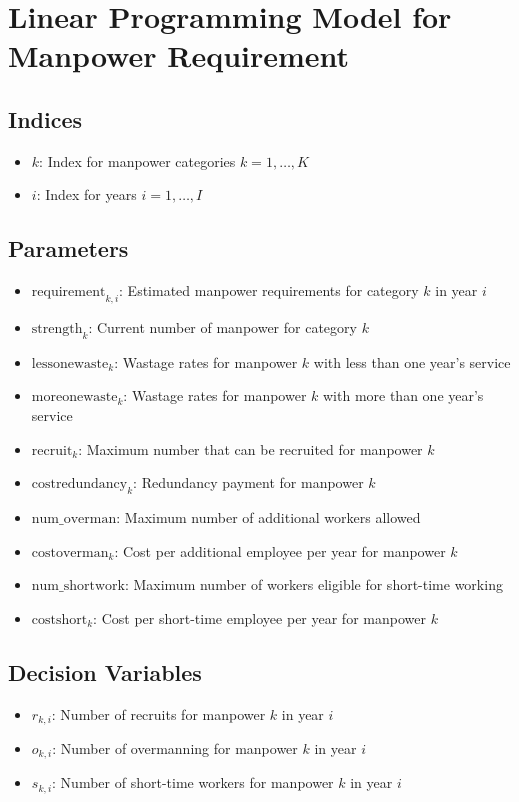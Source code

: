 \documentclass{article}
\begin{document}
\section*{Linear Programming Model for Manpower Requirement}

\subsection*{Indices}
\begin{itemize}
    \item \( k \): Index for manpower categories \( k = 1, \ldots, K \)
    \item \( i \): Index for years \( i = 1, \ldots, I \)
\end{itemize}

\subsection*{Parameters}
\begin{itemize}
    \item \( \text{requirement}_{k, i} \): Estimated manpower requirements for category \( k \) in year \( i \)
    \item \( \text{strength}_{k} \): Current number of manpower for category \( k \)
    \item \( \text{lessonewaste}_{k} \): Wastage rates for manpower \( k \) with less than one year's service
    \item \( \text{moreonewaste}_{k} \): Wastage rates for manpower \( k \) with more than one year's service
    \item \( \text{recruit}_{k} \): Maximum number that can be recruited for manpower \( k \)
    \item \( \text{costredundancy}_{k} \): Redundancy payment for manpower \( k \)
    \item \( \text{num\_overman} \): Maximum number of additional workers allowed
    \item \( \text{costoverman}_{k} \): Cost per additional employee per year for manpower \( k \)
    \item \( \text{num\_shortwork} \): Maximum number of workers eligible for short-time working
    \item \( \text{costshort}_{k} \): Cost per short-time employee per year for manpower \( k \)
\end{itemize}

\subsection*{Decision Variables}
\begin{itemize}
    \item \( r_{k,i} \): Number of recruits for manpower \( k \) in year \( i \)
    \item \( o_{k,i} \): Number of overmanning for manpower \( k \) in year \( i \)
    \item \( s_{k,i} \): Number of short-time workers for manpower \( k \) in year \( i \)
\end{itemize}
\end{document}
